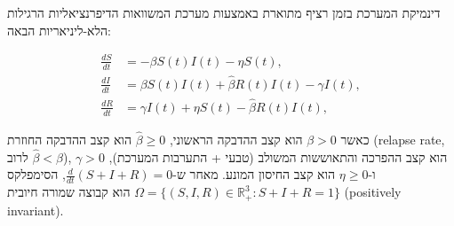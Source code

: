 דינמיקת המערכת בזמן רציף מתוארת באמצעות מערכת המשוואות הדיפרנציאליות הרגילות הלא-ליניאריות הבאה:
\begin{english}
\begin{align}
\frac{dS}{dt} &= -\beta S(t) I(t) - \eta S(t), \label{eq:siri-s} \\
\frac{dI}{dt} &= \beta S(t) I(t) + \hat{\beta} R(t) I(t) - \gamma I(t), \label{eq:siri-i} \\
\frac{dR}{dt} &= \gamma I(t) + \eta S(t) - \hat{\beta} R(t) I(t), \label{eq:siri-r}
\end{align}
\end{english}
כאשר $\beta > 0$ הוא קצב ההדבקה הראשוני, $\hat{\beta} \ge 0$ הוא קצב ההדבקה החוזרת (\textenglish{relapse rate}, לרוב $\hat{\beta} < \beta$), $\gamma > 0$ הוא קצב ההפרכה והתאוששות המשולב (טבעי + התערבות המערכת), ו-$\eta \ge 0$ הוא קצב החיסון המונע. מאחר ש-$\frac{d}{dt}(S+I+R) = 0$, הסימפלקס $\Omega = \{(S,I,R) \in \mathbb{R}_+^3 : S+I+R=1\}$ הוא קבוצה שמורה חיובית (\textenglish{positively invariant}).

